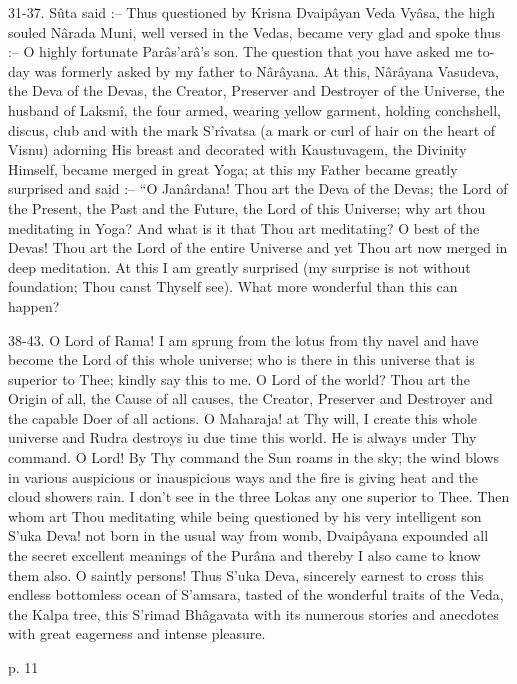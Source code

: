 31-37. Sûta said :-- Thus questioned by Krisna Dvaipâyan Veda Vyâsa, the high souled Nârada Muni, well versed in the Vedas, became very glad and spoke thus :-- O highly fortunate Parâs'arâ’s son. The question that you have asked me to-day was formerly asked by my father to Nârâyana. At this, Nârâyana Vasudeva, the Deva of the Devas, the Creator, Preserver and Destroyer of the Universe, the husband of Laksmî, the four armed, wearing yellow garment, holding conchshell, discus, club and with the mark S’rîvatsa (a mark or curl of hair on the heart of Visnu) adorning His breast and decorated with  Kaustuvagem, the Divinity Himself, became merged in great Yoga; at this my Father became greatly surprised and said :-- “O Janârdana! Thou art the Deva of the Devas; the Lord of the Present, the Past and the Future, the Lord of this Universe; why art thou meditating in Yoga? And what is it that Thou art meditating? O best of the Devas! Thou art the Lord of the entire Universe and yet Thou art now merged in deep meditation. At this I am greatly surprised (my surprise is not without foundation; Thou canst Thyself see). What more wonderful than this can happen?

 

38-43. O Lord of Rama! I am sprung from the lotus from thy navel and have become the Lord of this whole universe; who is there in this universe that is superior to Thee; kindly say this to me. O Lord of the world? Thou art the Origin of all, the Cause of all causes, the Creator, Preserver and Destroyer and the capable Doer of all actions. O Maharaja! at Thy will, I create this whole universe and Rudra destroys iu due time this world. He is always under Thy command. O Lord! By Thy command the Sun roams in the sky; the wind blows in various auspicious or inauspicious ways and the fire is giving heat and the cloud showers rain. I don’t see in the three Lokas any one superior to Thee. Then whom art Thou meditating while being questioned by his very intelligent son S’uka Deva! not born in the usual way from womb, Dvaipâyana expounded all the secret excellent meanings of the Purâna and thereby I also came to know them also. O saintly persons! Thus S’uka Deva, sincerely earnest to cross this endless bottomless ocean of S’amsara, tasted of the wonderful traits of the Veda, the Kalpa tree, this S’rimad Bhâgavata with its numerous stories and anecdotes with great eagerness and intense pleasure.

 

p. 11

 

